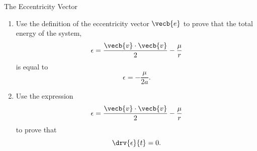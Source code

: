 \begin{hwkProblem}{1}{The Eccentricity Vector} \label{hwk:p01}

	\begin{enumerate}
		\item \label{hwk:p01a} Use the definition of the eccentricity vector \( \vecb{e} \) to prove that the total energy of the system, \[ \epsilon = \frac{\vecb{v} \cdot \vecb{v}}{2} - \frac{\mu}{r} \] is equal to \[ \epsilon = - \frac{\mu}{2 a} .\]
		\item \label{hwk:p01b} Use the expression \[ \epsilon = \frac{\vecb{v} \cdot \vecb{v}}{2} - \frac{\mu}{r} \] to prove that \[ \drv{\epsilon}{t} = 0 .\]
	\end{enumerate}

	\hwkSol{} \label{hwk:s01}

	\hwkPart{} \label{hwk:s01a}


\end{hwkProblem}
